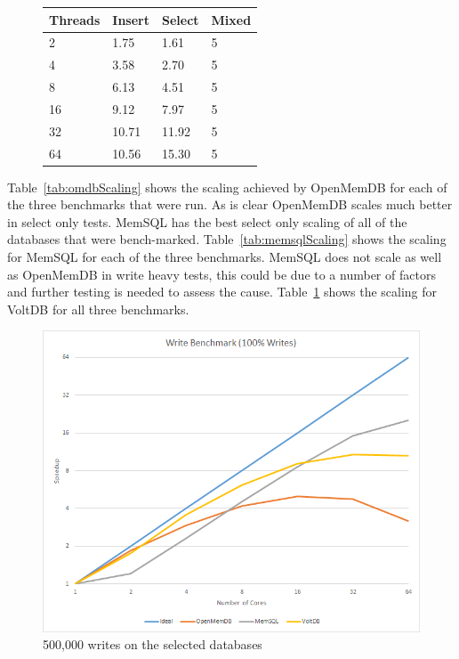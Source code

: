 \documentclass[conference, compsoc]{IEEEtran}
\begin{document}
\par\vspace{\baselineskip}
\begin{figure}[H]
\begin{center}
 \label{tab:voltScaling}
  \begin{tabular}{  l  l  l  l }
    \midrule
    \bf Threads & \bf Insert & \bf Select & \bf Mixed \\ \midrule
     2 & 1.75 & 1.61 & 5 \\ \midrule
     4 & 3.58 & 2.70 & 5 \\ \midrule
     8 & 6.13 & 4.51 & 5 \\ \midrule
     16 & 9.12 & 7.97 & 5 \\ \midrule
     32 & 10.71 & 11.92 & 5 \\ \midrule
     64 & 10.56 & 15.30 & 5 \\ \midrule
  \end{tabular}
\end{center}
\end{figure}


Table~\ref{tab:omdbScaling} shows the scaling achieved by OpenMemDB for each of the three
benchmarks that were run. As is clear OpenMemDB scales much better in select only tests. 
MemSQL has the best select only scaling of all of the databases that were bench-marked.  
Table~\ref{tab:memsqlScaling} shows the scaling for MemSQL for each of the three benchmarks. 
MemSQL does not scale as well as OpenMemDB in write heavy tests, this could be due to a number of factors
and further testing is needed to assess the cause.
Table~\ref{tab:voltScaling} shows the scaling for VoltDB for all three benchmarks.

\begin{figure}[H]
 \begin{center}
   \includegraphics[scale=.5]{WriteBenchmark.png}
  \caption{500,000 writes on the selected databases}
  \label{fig:writeBenchmark}
   \end{center}
\end{figure}
\end{document}
